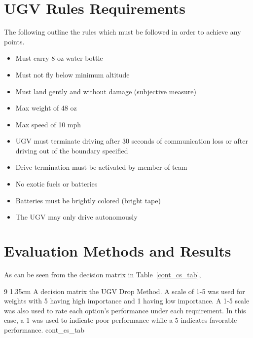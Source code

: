 \documentclass[]{auvsi_doc}
\begin{document}
\begin{AUVSITitlePage}
\begin{artifacttable}
\end{artifacttable}
\end{AUVSITitlePage}

\section{UGV Rules Requirements}
The following outline the rules which must be followed in order to achieve any points. 
\begin{itemize}
	\item Must carry 8 oz water bottle
	\item Must not fly below minimum altitude
	\item Must land gently and without damage (subjective measure)
	\item Max weight of 48 oz
	\item Max speed of 10 mph
	\item UGV must terminate driving after 30 seconds of communication loss or after driving out of the boundary specified
	\item Drive termination must be activated by member of team
	\item No exotic fuels or batteries
	\item Batteries must be brightly colored (bright tape)
	\item The UGV may only drive autonomously
\end{itemize}

\section{Evaluation Methods and Results}

As can be seen from the decision matrix in Table~\ref{cont_cs_tab}, 

\begin{AUVSITable}
{9}
{1.35cm}
{A decision matrix the UGV Drop Method. A scale of 1-5 was used for weights with 5 having high importance and 1 having low importance. A 1-5 scale was also used to rate each option’s performance under each requirement. In this case, a 1 was used to indicate poor performance while a 5 indicates favorable performance.}
{cont_cs_tab}


\end{AUVSITable}


\end{document}
